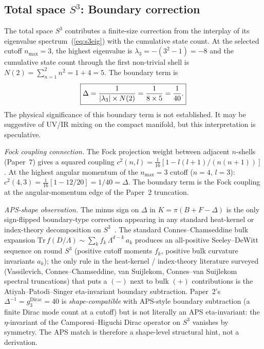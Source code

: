 \documentclass[aps,prl,twocolumn,superscriptaddress]{revtex4-2}
\begin{document}
\subsection{Total space $S^3$: Boundary correction}

The total space $S^3$ contributes a finite-size correction from
the interplay of its eigenvalue spectrum~(\ref{eq:s3eig}) with the
cumulative state count. At the selected cutoff $n_{\max} = 3$, the
highest eigenvalue is $\lambda_3 = -(3^2 - 1) = -8$ and the
cumulative state count through the first non-trivial shell is
$N(2) = \sum_{n=1}^{2} n^2 = 1 + 4 = 5$. The boundary term is
\begin{equation}\label{eq:boundary}
  \boxed{\Delta = \frac{1}{|\lambda_3| \times N(2)}
                = \frac{1}{8 \times 5} = \frac{1}{40}.}
                \vphantom{\Bigg|}
\end{equation}
The physical significance of this boundary term is not established.
It may be suggestive of UV/IR mixing on the compact manifold, but
this interpretation is speculative.

\emph{Fock coupling connection.}  The Fock projection weight between
adjacent $n$-shells (Paper~7) gives a squared coupling
$c^2(n,l) = \tfrac{1}{16}[1 - l(l+1)/(n(n+1))]$.  At the highest
angular momentum of the $n_{\max} = 3$ cutoff ($n = 4$, $l = 3$):
$c^2(4,3) = \tfrac{1}{16}[1 - 12/20] = 1/40 = \Delta$.  The boundary
term is the Fock coupling at the angular-momentum edge of the
Paper~2 truncation.

\emph{APS-shape observation.} The minus sign on $\Delta$ in
$K = \pi(B + F - \Delta)$ is the only sign-flipped boundary-type
correction appearing in any standard heat-kernel or index-theory
decomposition on $S^3$~\cite{alpha_sprint_a_memo}. The standard
Connes--Chamseddine bulk expansion
$\mathrm{Tr}\,f(D/\Lambda) \sim \sum_k f_k\,\Lambda^{d-k}\,a_k$
produces an all-positive Seeley--DeWitt sequence on round $S^3$
(positive cutoff moments $f_k$, positive bulk curvature invariants
$a_k$); the only rule in the heat-kernel / index-theory literature
surveyed (Vassilevich, Connes--Chamseddine, van Suijlekom,
Connes--van Suijlekom spectral truncations) that puts a $(-)$ next
to bulk $(+)$ contributions is the Atiyah--Patodi--Singer
eta-invariant boundary subtraction. Paper~2's
$\Delta^{-1} = g_3^{\mathrm{Dirac}} = 40$ is
\emph{shape-compatible} with APS-style boundary subtraction (a
finite Dirac mode count at a cutoff) but is not literally an APS
eta-invariant: the $\eta$-invariant of the Camporesi--Higuchi Dirac
operator on $S^3$ vanishes by symmetry. The APS match is therefore
a shape-level structural hint, not a derivation.
\end{document}
